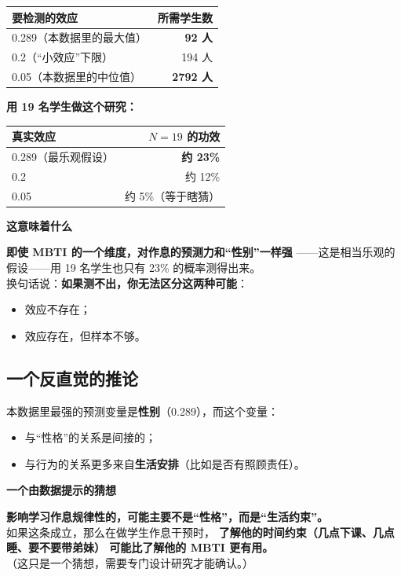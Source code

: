 \documentclass[UTF8,a4paper,11pt]{ctexart}
\newenvironment{explainbox}[1]
{\begin{center}\begin{minipage}{0.94\textwidth}\colorbox{boxbg}{\parbox{0.92\textwidth}{\textbf{#1}\par\vspace{2pt}}}}
{\end{minipage}\end{center}}
\begin{document}
\begin{center}
\begin{tabular}{lr}
\toprule
\textbf{要检测的效应} & \textbf{所需学生数} \\
\midrule
0.289（本数据里的最大值） & \textbf{92 人} \\
0.2（“小效应”下限） & 194 人 \\
0.05（本数据里的中位值） & \textbf{2792 人} \\
\bottomrule
\end{tabular}
\end{center}

\textbf{用 19 名学生做这个研究：}

\begin{center}
\begin{tabular}{lr}
\toprule
\textbf{真实效应} & \textbf{$N=19$ 的功效} \\
\midrule
0.289（最乐观假设） & \textbf{约 23\%} \\
0.2 & 约 12\% \\
0.05 & 约 5\%（等于瞎猜） \\
\bottomrule
\end{tabular}
\end{center}

\begin{explainbox}{这意味着什么}
\textbf{即使 MBTI 的一个维度，对作息的预测力和“性别”一样强}
——这是相当乐观的假设——用 19 名学生也只有 23\% 的概率测得出来。\\[6pt]
换句话说：\textbf{如果测不出，你无法区分这两种可能}：
\begin{itemize}[leftmargin=1.4em,itemsep=1pt]
\item 效应不存在；
\item 效应存在，但样本不够。
\end{itemize}
\end{explainbox}

\subsection{一个反直觉的推论}

本数据里最强的预测变量是\textbf{性别}（0.289），而这个变量：
\begin{itemize}[leftmargin=1.6em]
\item 与“性格”的关系是间接的；
\item 与行为的关系更多来自\textbf{生活安排}（比如是否有照顾责任）。
\end{itemize}

\begin{explainbox}{一个由数据提示的猜想}
\textbf{影响学习作息规律性的，可能主要不是“性格”，而是“生活约束”。}\\[4pt]
如果这条成立，那么在做学生作息干预时，
\textbf{了解他的时间约束（几点下课、几点睡、要不要带弟妹）
可能比了解他的 MBTI 更有用。}\\[4pt]
（这只是一个猜想，需要专门设计研究才能确认。）
\end{explainbox}
\end{document}
